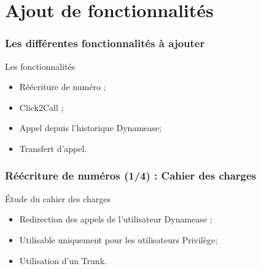 \section{Ajout de fonctionnalités}
\author{Kévin Moreau}


\begin{frame}
	\frametitle{Les différentes fonctionnalités à ajouter}

	\begin{block}{Les fonctionnalités}
	 \begin{itemize}
      \item Réécriture de numéro ;
	  \item Click2Call ;
	  \item Appel depuis l'historique Dynamease;
	  \item Transfert d'appel.
	 \end{itemize}
	\end{block}
\end{frame}

\begin{frame}
	\frametitle{Réécriture de numéros (1/4) : Cahier des charges}

	\begin{block}{Étude du cahier des charges}
	 \begin{itemize}
      \item Redirection des appels de l'utilisateur Dynamease ;
      \item Utilisable uniquement pour les utilisateurs Privilège;
      \item Utilisation d'un Trunk.
	 \end{itemize}
	\end{block}
\end{frame}

